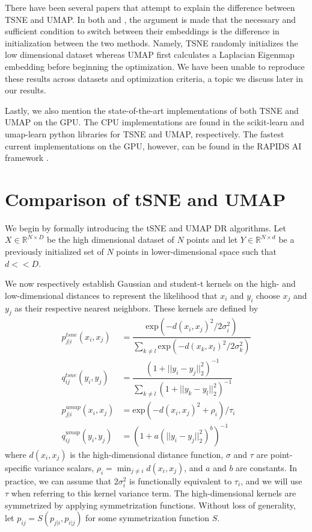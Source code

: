 \documentclass[sigconf, nonacm]{acmart}
\begin{document}
There have been several papers that attempt to explain the difference between TSNE and UMAP. In both \cite{kobak2019umap} and \cite{kobak2021initialization},
the argument is made that the necessary and sufficient condition to switch between their embeddings is the difference in initialization between the two methods.
Namely, TSNE randomly initializes the low dimensional dataset whereas UMAP first calculates a Laplacian Eigenmap \cite{belkin2003laplacian} embedding before
beginning the optimization. We have been unable to reproduce these results across datasets and optimization criteria, a topic we discuss later in our results.

Lastly, we also mention the state-of-the-art implementations of both TSNE and UMAP on the GPU. The CPU implementations are found in the scikit-learn and
umap-learn python libraries for TSNE and UMAP, respectively. The fastest current implementations on the GPU, however, can be found in the RAPIDS AI
framework \cite{nolet2020bringing} \cite{rapidsframework}.

\section{Comparison of tSNE and UMAP} \label{comparison}
We begin by formally introducing the tSNE and UMAP DR algorithms. Let $X \in \mathbb{R}^{N \times D}$ be the high dimensional dataset of $N$ points and let $Y
\in \mathbb{R}^{N \times d}$ be a previously initialized set of $N$ points in lower-dimensional space such that $d << D$. 

We now respectively establish Gaussian and student-t kernels on the high- and low-dimensional distances to represent the likelihood that $x_i$ and $y_i$ choose
$x_j$ and $y_j$ as their respective nearest neighbors. These kernels are defined by
\begin{align}
    p^{tsne}_{j|i}(x_i, x_j) &= \dfrac{\text{exp}(-d(x_i, x_j)^2 / 2 \sigma_i^2)}{\sum_{k \neq l} \text{exp}(-d(x_k, x_l)^2 / 2 \sigma_k^2)} \\[0.5ex]
    q^{tsne}_{ij}(y_i, y_j) &= \dfrac{(1 + ||y_i - y_j||^2_2)^{-1}}{\sum_{k \neq l} (1 + ||y_k - y_l||^2_2)^{-1}} \\[1.5ex]
    p^{umap}_{j|i}(x_i, x_j) &= \text{exp} (-d(x_i, x_j)^2 + \rho_{i}) /\tau_i \\[0.3ex]
    q^{umap}_{ij}(y_i, y_j) &= \left( 1 + a(||y_i - y_j||^2_2)^b \right) ^{-1}
\end{align}
where $d(x_i, x_j)$ is the high-dimensional distance function, $\sigma$ and $\tau$ are point-specific variance scalars, $\rho_i = \min_{j \neq i} d(x_i, x_j)$,
and $a$ and $b$ are constants. In practice, we can assume that $2 \sigma_i^2$ is functionally equivalent to $\tau_i$, and we will use $\tau$ when referring to
this kernel variance term. The high-dimensional kernels are symmetrized by applying symmetrization functions. Without loss of generality, let $p_{ij}
= S(p_{j|i}, p_{i|j})$ for some symmetrization function $S$.
\end{document}
